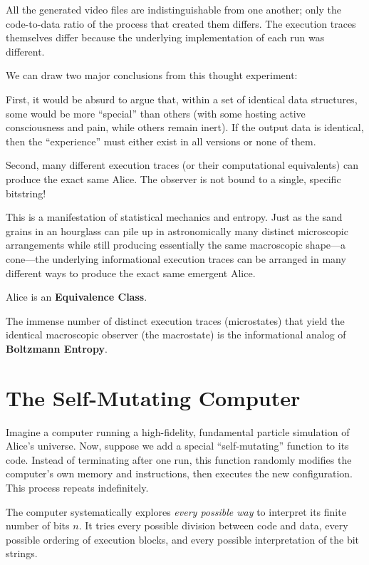All the generated video files are indistinguishable from one another; only the code-to-data ratio of the process that created them differs. 
The execution traces themselves differ because the underlying implementation of each run was different.

We can draw two major conclusions from this thought experiment:

First, it would be absurd to argue that, within a set of identical data structures, some would be more ``special'' than others (with some hosting active consciousness and pain, while others remain inert). 
If the output data is identical, then the ``experience'' must either exist in all versions or none of them.

Second, many different execution traces (or their computational equivalents) can produce the exact same Alice. 
The observer is not bound to a single, specific bitstring!

This is a manifestation of statistical mechanics and entropy. 
Just as the sand grains in an hourglass can pile up in astronomically many distinct microscopic arrangements while still producing essentially the same macroscopic shape---a cone---the underlying informational execution traces can be arranged in many different ways to produce the exact same emergent Alice.

Alice is an \textbf{Equivalence Class}.

The immense number of distinct execution traces (microstates) that yield the identical macroscopic observer (the macrostate) is the informational analog of \textbf{Boltzmann Entropy}.


\section{The Self-Mutating Computer}

Imagine a computer running a high-fidelity, fundamental particle simulation of Alice's universe. 
Now, suppose we add a special ``self-mutating'' function to its code. 
Instead of terminating after one run, this function randomly modifies the computer's own memory and instructions, then executes the new configuration. This process repeats indefinitely.

The computer systematically explores \emph{every possible way} to interpret its finite number of bits $n$. 
It tries every possible division between code and data, every possible ordering of execution blocks, and every possible interpretation of the bit strings. 

